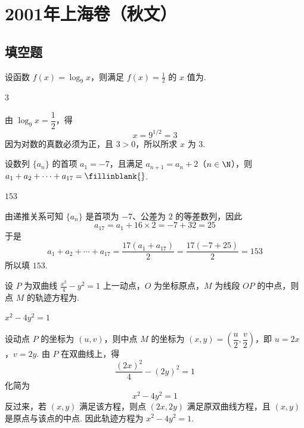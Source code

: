 \chapter{2001年上海卷（秋文）}
\section{填空题}
\begin{problem}
设函数 \(f(x)=\log_{9}x\)，则满足 \(f(x)=\frac{1}{2}\) 的 \(x\) 值为\fillinblank{}.
\end{problem}

\begin{answer}
\(3\)
\end{answer}

\begin{solution}
由 \(\log_{9}x=\dfrac{1}{2}\)，得
\[
x=9^{1/2}=3
\]
因为对数的真数必须为正，且 \(3>0\)，所以所求 \(x\) 为 \(3\).
\end{solution}

\begin{problem}
设数列 \(\{a_n\}\) 的首项 \(a_1=-7\)，且满足 \(a_{n+1}=a_n+2\)（\(n\in\N\)），则 \(a_1+a_2+\cdots+a_{17}=\fillinblank{}\).
\end{problem}

\begin{answer}
\(153\)
\end{answer}

\begin{solution}
由递推关系可知 \(\{a_n\}\) 是首项为 \(-7\)、公差为 \(2\) 的等差数列，因此
\[
a_{17}=a_1+16\times2=-7+32=25
\]
于是
\[
a_1+a_2+\cdots+a_{17}=\frac{17(a_1+a_{17})}{2}=\frac{17(-7+25)}{2}=153
\]
所以填 \(153\).
\end{solution}

\begin{problem}
设 \(P\) 为双曲线 \(\frac{x^2}{4}-y^2=1\) 上一动点，\(O\) 为坐标原点，\(M\) 为线段 \(OP\) 的中点，则点 \(M\) 的轨迹方程为\fillinblank{}.
\end{problem}

\begin{answer}
\(x^2-4y^2=1\)
\end{answer}

\begin{solution}
设动点 \(P\) 的坐标为 \((u,v)\)，则中点 \(M\) 的坐标为 \((x,y)=\left(\dfrac{u}{2},\dfrac{v}{2}\right)\)，即 \(u=2x\)，\(v=2y\). 由 \(P\) 在双曲线上，得
\[
\frac{(2x)^2}{4}-(2y)^2=1
\]
化简为
\[
x^2-4y^2=1
\]
反过来，若 \((x,y)\) 满足该方程，则点 \((2x,2y)\) 满足原双曲线方程，且 \((x,y)\) 是原点与该点的中点. 因此轨迹方程为 \(x^2-4y^2=1\).
\end{solution}

